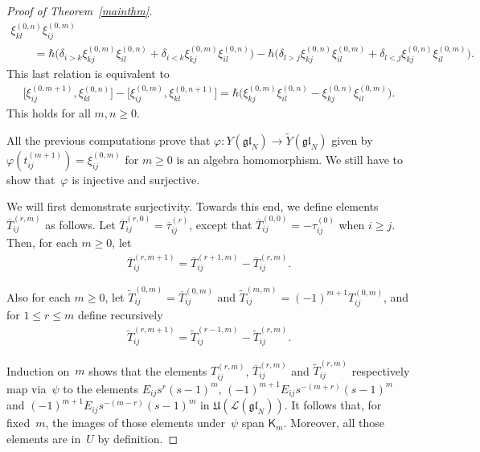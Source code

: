 \documentclass[pdftex]{sigma}
\numberwithin{theorem}{section}
\numberwithin{proposition}{section}
\numberwithin{lemma}{section}
\numberwithin{corollary}{section}
\numberwithin{definition}{section}
\numberwithin{example}{section}
\numberwithin{remark}{section}
\numberwithin{note}{section}
\numberwithin{equation}{section}
\begin{document}
\begin{proof}[Proof of Theorem~\ref{mainthm}]
\begin{gather*}
\xi_{kl}^{(0,n)} \xi_{ij}^{(0,m)}
\\
\qquad
= \hbar \big(\delta_{i>k} \xi_{kj}^{(0,m)} \xi_{il}^{(0,n)}+ \delta_{i<k} \xi_{kj}^{(0,m)} \xi_{il}^{(0,n)}\big)
  - \hbar \big(\delta_{l>j} \xi_{kj}^{(0,n)} \xi_{il}^{(0,m)} + \delta_{l<j} \xi_{kj}^{(0,n)} \xi_{il}^{(0,m)}\big).
\end{gather*}
This last relation is equivalent to
\begin{gather*}
\big[\xi_{ij}^{(0,m+1)}, \xi_{kl}^{(0,n)}\big] - \big[\xi_{ij}^{(0,m)}, \xi_{kl}^{(0,n+1)}\big] = \hbar \big(\xi_{kj}^{(0,m)}
\xi_{il}^{(0,n)} - \xi_{kj}^{(0,n)} \xi_{il}^{(0,m)}\big).
\end{gather*}
This holds for all $m,n\ge 0$.

All the previous computations prove that $\varphi\colon Y(\mathfrak{gl}_N) \longrightarrow
\widetilde{Y}(\mathfrak{gl}_N)$ given by $\varphi(t_{ij}^{(m+1)}) = \xi_{ij}^{(0,m)}$ for $m\ge 0$ is an
algebra homomorphism.
We still have to show that~$\varphi$ is injective and surjective.

We will f\/irst demonstrate surjectivity.
Towards this end, we def\/ine elements $\overline{T}_{ij}^{(r,m)}$ as follows.
Let $\overline{T}_{ij}^{(r,0)}=\overline{\tau}_{ij}^{(r)}$, except that $\overline{T}_{ij}^{(0,0)}=-\tau_{ij}^{(0)}$
when $i \geq j$.
Then, for each $m \geq 0$, let
\begin{gather*}
\overline{T}_{ij}^{(r,m+1)}=\overline{T}_{ij}^{(r+1,m)}-\overline{T}_{ij}^{(r,m)}.
\end{gather*}

Also for each $m \geq 0$, let $\widetilde{T}_{ij}^{(0,m)}=\overline{T}_{ij}^{(0,m)}$ and
$\widetilde{T}_{ij}^{(m,m)}=(-1)^{m+1}T_{ij}^{(0,m)}$, and for $1 \leq r \leq m$ def\/ine recursively
\begin{gather*}
\widetilde{T}_{ij}^{(r,m+1)}=\widetilde{T}_{ij}^{(r-1,m)}-\widetilde{T}_{ij}^{(r,m)}.
\end{gather*}


Induction on~$m$ shows that the elements $T_{ij}^{(r,m)}$, $\overline{T}_{ij}^{(r,m)}$ and $\widetilde{T}_{ij}^{(r,m)}$
respectively map via~$\psi$ to the elements $E_{ij}s^r(s-1)^m$, $(-1)^{m+1}E_{ij}s^{-(m+r)}(s-1)^m$ and
$(-1)^{m+1}E_{ij}s^{-(m-r)}(s-1)^m$ in $\mathfrak{U}(\mathcal{L}(\mathfrak{gl}_N))$.
It follows that, for f\/ixed~$m$, the images of those elements under~$\psi$ span $\mathsf{K}_m$.
Moreover, all those elements are in~$U$ by def\/inition.


\end{proof}
\end{document}
